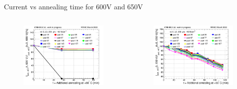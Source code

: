 \documentclass{beamer}
\begin{document}
\begin{frame}{Current vs annealing time for 600V and 650V}
  \begin{columns}
       \begin{figure}
           \includegraphics[width=1.0\textwidth]{plots/annealing_current_N4790_09.png}
       \end{figure}
       \begin{figure}
           \includegraphics[width=1.0\textwidth]{plots/8in_198ch_2019_N4790_21_4E15_neg40degC_annealing_current_650.png}
       \end{figure}
   \end{columns}
\end{frame}
\end{document}
